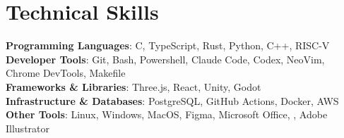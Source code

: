 
\section{Technical Skills}
\begin{itemize}[leftmargin=0in, label={}]
  \small{\item{
          \textbf{Programming Languages}{: C, TypeScript, Rust, Python, C++, RISC-V} \\
          \textbf{Developer Tools}{: Git, Bash, Powershell, Claude Code, Codex, NeoVim, Chrome DevTools, Makefile} \\
          \textbf{Frameworks \& Libraries}{: Three.js, React, Unity, Godot} \\
          \textbf{Infrastructure \& Databases}{: PostgreSQL, GitHub Actions, Docker, AWS} \\
          \textbf{Other Tools}{: Linux, Windows, MacOS, Figma, Microsoft Office, , Adobe Illustrator} 
        }}
\end{itemize}
